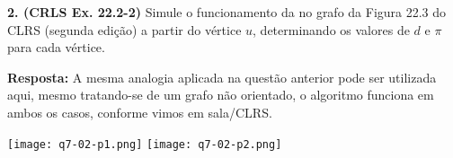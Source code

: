 
\noindent\textbf{2. (CRLS Ex. 22.2-2)} Simule o funcionamento da  no grafo da Figura 22.3 do CLRS (segunda
edição) a partir do vértice $u$, determinando os valores de $d$ e $\pi$ para cada vértice.

\textbf{Resposta:} A mesma analogia aplicada na questão anterior pode ser utilizada aqui, mesmo tratando-se de um grafo não orientado, o algoritmo  funciona em ambos os casos, conforme vimos em sala/CLRS.

\begin{center}
\texttt{[image: q7-02-p1.png]}
\texttt{[image: q7-02-p2.png]}
\label{fig:7.2-1}
\end{center}